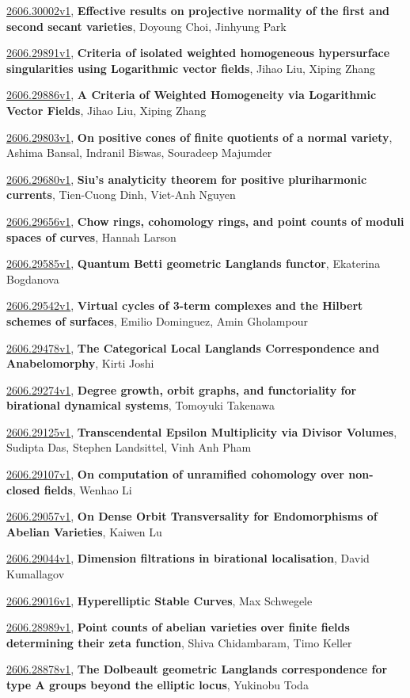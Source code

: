 \documentclass[9pt, a4paper]{article}
\theoremstyle{plain}
\theoremstyle{definition}
\theoremstyle{remark}
\newcommand{\arxiv}[3]{\href{https://arxiv.org/abs/#1}{#1}, \textbf{\textcolor{arxivblue}{#2}}, #3}
\begin{document}
\arxiv{2606.30002v1}{Effective results on projective normality of the first and second secant varieties}{Doyoung Choi, Jinhyung Park}

\arxiv{2606.29891v1}{Criteria of isolated weighted homogeneous hypersurface singularities using Logarithmic vector fields}{Jihao Liu, Xiping Zhang}

\arxiv{2606.29886v1}{A Criteria of Weighted Homogeneity via Logarithmic Vector Fields}{Jihao Liu, Xiping Zhang}

\arxiv{2606.29803v1}{On positive cones of finite quotients of a normal variety}{Ashima Bansal, Indranil Biswas, Souradeep Majumder}

\arxiv{2606.29680v1}{Siu's analyticity theorem for positive pluriharmonic currents}{Tien-Cuong Dinh, Viet-Anh Nguyen}

\arxiv{2606.29656v1}{Chow rings, cohomology rings, and point counts of moduli spaces of curves}{Hannah Larson}

\arxiv{2606.29585v1}{Quantum Betti geometric Langlands functor}{Ekaterina Bogdanova}

\arxiv{2606.29542v1}{Virtual cycles of 3-term complexes and the Hilbert schemes of surfaces}{Emilio Dominguez, Amin Gholampour}

\arxiv{2606.29478v1}{The Categorical Local Langlands Correspondence and Anabelomorphy}{Kirti Joshi}

\arxiv{2606.29274v1}{Degree growth, orbit graphs, and functoriality for birational dynamical systems}{Tomoyuki Takenawa}

\arxiv{2606.29125v1}{Transcendental Epsilon Multiplicity via Divisor Volumes}{Sudipta Das, Stephen Landsittel, Vinh Anh Pham}

\arxiv{2606.29107v1}{On computation of unramified cohomology over non-closed fields}{Wenhao Li}

\arxiv{2606.29057v1}{On Dense Orbit Transversality for Endomorphisms of Abelian Varieties}{Kaiwen Lu}

\arxiv{2606.29044v1}{Dimension filtrations in birational localisation}{David Kumallagov}

\arxiv{2606.29016v1}{Hyperelliptic Stable Curves}{Max Schwegele}

\arxiv{2606.28989v1}{Point counts of abelian varieties over finite fields determining their zeta function}{Shiva Chidambaram, Timo Keller}

\arxiv{2606.28878v1}{The Dolbeault geometric Langlands correspondence for type A groups beyond the elliptic locus}{Yukinobu Toda}
\end{document}
